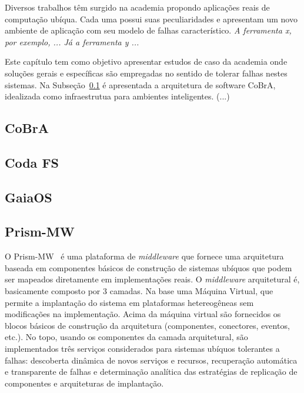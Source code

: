 Diversos trabalhos têm surgido na academia propondo aplicações reais de computação ubíqua. Cada uma possui suas peculiaridades e apresentam um novo ambiente de aplicação com seu modelo de falhas característico. \emph{A ferramenta x, por exemplo, ... Já a ferramenta y ...}

Este capítulo tem como objetivo apresentar estudos de caso da academia onde soluções gerais e específicas são empregadas no sentido de tolerar falhas nestes sistemas. Na Subseção~\ref{sub:cobra} é apresentada a arquitetura de software CoBrA, idealizada como infraestrutua para ambientes inteligentes. (...)

\subsection{CoBrA} %
\label{sub:cobra}


\subsection{Coda FS} %
\label{sub:coda_fs}


\subsection{GaiaOS} %
\label{sub:gaiaos}


\subsection{Prism-MW} %
\label{sub:prism_mw}

O Prism-MW~\cite{Seo07} é uma plataforma de \emph{middleware} que fornece uma arquitetura baseada em componentes básicos de construção de sistemas ubíquos que podem ser mapeados diretamente em implementações reais. O \emph{middleware} arquitetural é, basicamente composto por 3 camadas. Na base uma Máquina Virtual, que permite a implantação do sistema em plataformas hetereogêneas sem modificações na implementação. Acima da máquina virtual são fornecidos os blocos básicos de construção da arquitetura (componentes, conectores, eventos, etc.). No topo, usando os componentes da camada arquitetural, são implementados três serviços considerados  para sistemas ubíquos tolerantes a falhas: descoberta dinâmica de novos serviços e recursos, recuperação automática e transparente de falhas e determinação analítica das estratégias de replicação de componentes e arquiteturas de implantação.

